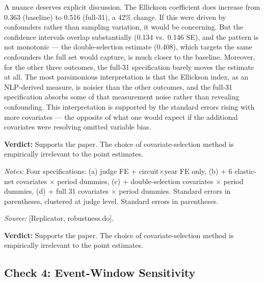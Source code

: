 \documentclass[12pt,a4paper]{article}
\begin{document}
A nuance deserves explicit discussion. The Ellickson coefficient does increase from 0.363 (baseline) to 0.516 (full-31), a 42\% change. If this were driven by confounders rather than sampling variation, it would be concerning. But the confidence intervals overlap substantially (0.134 vs.\ 0.146 SE), and the pattern is not monotonic --- the double-selection estimate (0.408), which targets the same confounders the full set would capture, is much closer to the baseline. Moreover, for the other three outcomes, the full-31 specification barely moves the estimate at all. The most parsimonious interpretation is that the Ellickson index, as an NLP-derived measure, is noisier than the other outcomes, and the full-31 specification absorbs some of that measurement noise rather than revealing confounding. This interpretation is supported by the standard errors rising with more covariates --- the opposite of what one would expect if the additional covariates were resolving omitted variable bias.

\textbf{Verdict:} Supports the paper. The choice of covariate-selection method is empirically irrelevant to the point estimates.

\begin{table}[htbp]
\centering
\caption{Coefficient Stability Across Covariate Selection Methods}
\label{tab:double_select}
\begin{threeparttable}

\begin{tablenotes}
\item {\small \textit{Notes:} Four specifications: (a) judge FE + circuit$\times$year FE only, (b) + 6 elastic-net covariates $\times$ period dummies, (c) + double-selection covariates $\times$ period dummies, (d) + full 31 covariates $\times$ period dummies. Standard errors in parentheses, clustered at judge level. Standard errors in parentheses.}
\item {\small \textit{Source:} [Replicator, robustness.do].}
\end{tablenotes}
\end{threeparttable}
\end{table}

\textbf{Verdict:} Supports the paper. The choice of covariate-selection method is empirically irrelevant to the point estimates.

\subsection{Check 4: Event-Window Sensitivity}
\label{sec:check4}
\end{document}
